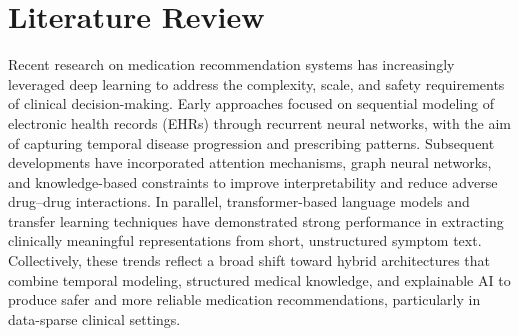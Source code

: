 \section{Literature Review}

Recent research on medication recommendation systems has increasingly leveraged deep learning to address the complexity, scale, and safety requirements of clinical decision-making. Early approaches focused on sequential modeling of electronic health records (EHRs) through recurrent neural networks, with the aim of capturing temporal disease progression and prescribing patterns. Subsequent developments have incorporated attention mechanisms, graph neural networks, and knowledge-based constraints to improve interpretability and reduce adverse drug--drug interactions. In parallel, transformer-based language models and transfer learning techniques have demonstrated strong performance in extracting clinically meaningful representations from short, unstructured symptom text. Collectively, these trends reflect a broad shift toward hybrid architectures that combine temporal modeling, structured medical knowledge, and explainable AI to produce safer and more reliable medication recommendations, particularly in data-sparse clinical settings.


